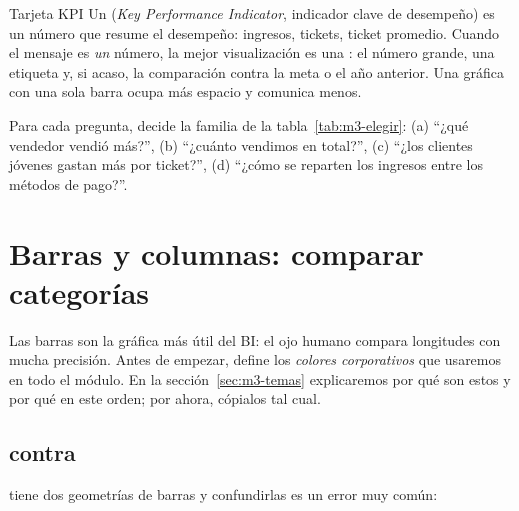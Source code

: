 \begin{concepto}{Tarjeta KPI}
Un  (\emph{Key Performance Indicator}, indicador clave de
desempeño) es un número que resume el desempeño: ingresos, tickets, ticket
promedio. Cuando el mensaje es \emph{un} número, la mejor visualización es
una : el número grande, una etiqueta y, si acaso, la
comparación contra la meta o el año anterior. Una gráfica con una sola barra
ocupa más espacio y comunica menos.
\end{concepto}

\begin{hazlotu}
Para cada pregunta, decide la familia de la tabla~\ref{tab:m3-elegir}:
(a) ``¿qué vendedor vendió más?'', (b) ``¿cuánto vendimos en total?'',
(c) ``¿los clientes jóvenes gastan más por ticket?'', (d) ``¿cómo se
reparten los ingresos entre los métodos de pago?''.
\end{hazlotu}

\section{Barras y columnas: comparar categorías}
\label{sec:m3-barras}

Las barras son la gráfica más útil del BI: el ojo humano compara longitudes
con mucha precisión. Antes de empezar, define los \emph{colores
corporativos} que usaremos en todo el módulo. En la
sección~\ref{sec:m3-temas} explicaremos por qué son estos y por qué en este
orden; por ahora, cópialos tal cual.


\subsection{\texorpdfstring{ contra }{geom\_col() contra geom\_bar()}}

 tiene dos geometrías de barras y confundirlas es un error
muy común:

